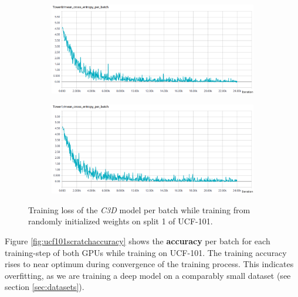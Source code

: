 \begin{figure}[H]
    \begin{subfigure}[c]{\textwidth}
    \centering
    \includegraphics[width=\textwidth]{img_evaluation/ucf101_scratch/tower0crossentropy}
    \end{subfigure}
    \begin{subfigure}[c]{\textwidth}
    \includegraphics[width=\textwidth]{img_evaluation/ucf101_scratch/tower1crossentropy}
    \end{subfigure}
    \caption{Training loss of the \textit{C3D} model per batch while training from randomly initialized weights on split 1 of UCF-101.}
    \label{fig:ucf101scratchloss}
\end{figure}

Figure \ref{fig:ucf101scratchaccuracy} shows the \textbf{accuracy} per batch for each training-step of both GPUs while training on UCF-101.
The training accuracy rises to near optimum during convergence of the training process.
This indicates overfitting, as we are training a deep model on a comparably small dataset (see section \ref{sec:datasets}).

